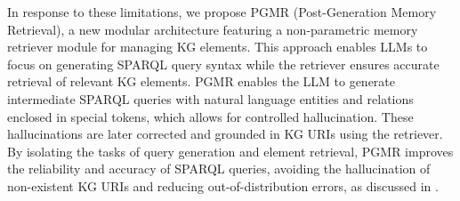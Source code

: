 In response to these limitations, we propose PGMR (Post-Generation Memory Retrieval), a new modular architecture featuring a non-parametric memory retriever module for managing KG elements. This approach enables LLMs to focus on generating SPARQL query syntax while the retriever ensures accurate retrieval of relevant KG elements.
PGMR enables the LLM to generate intermediate SPARQL queries with natural language entities and relations enclosed in special tokens, which allows for controlled hallucination. These hallucinations are later corrected and grounded in KG URIs using the retriever.
By isolating the tasks of query generation and element retrieval, PGMR improves the reliability and accuracy of SPARQL queries, avoiding the hallucination of non-existent KG URIs and reducing out-of-distribution errors, as discussed in .




